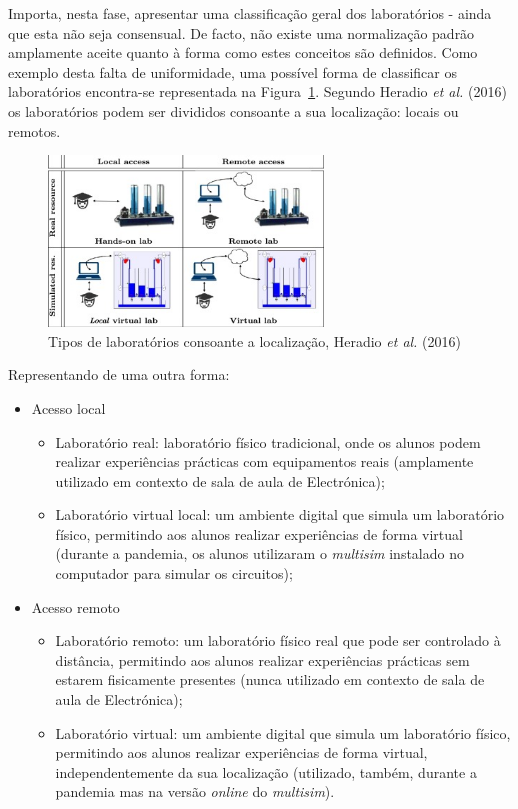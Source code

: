 Importa, nesta fase, apresentar uma classificação geral dos laboratórios - ainda que esta não seja consensual. De facto, não existe uma normalização padrão amplamente aceite quanto à forma como estes conceitos são definidos. Como exemplo desta falta de uniformidade, uma possível forma de classificar os laboratórios encontra-se representada na Figura~\ref{fig:classificaçãoHeratio}. Segundo Heradio \textit{et al.} (2016) \cite{HERADIO20161} os laboratórios podem ser divididos consoante a sua localização: locais ou remotos.

\begin{figure}[hbtp]
    \centering
    \includegraphics[width=0.65\textwidth]{figures/caracteristica_laboratories.jpg}
    \caption{Tipos de laboratórios consoante a localização, Heradio \textit{et al.} (2016) \cite{HERADIO20161}}
    \label{fig:classificaçãoHeratio}
\end{figure}

Representando de uma outra forma:
\begin{itemize}
    \item Acesso local
          \begin{itemize}
              \item Laboratório real: laboratório físico tradicional, onde os alunos podem realizar experiências prácticas com equipamentos reais (amplamente utilizado em contexto de sala de aula de Electrónica);
              \item Laboratório virtual local: um ambiente digital que simula um laboratório físico, permitindo aos alunos realizar experiências de forma virtual (durante a pandemia, os alunos utilizaram o \textit{multisim} instalado no computador para simular os circuitos);
          \end{itemize}
    \item Acesso remoto
          \begin{itemize}
              \item Laboratório remoto: um laboratório físico real que pode ser controlado à distância, permitindo aos alunos realizar experiências prácticas sem estarem fisicamente presentes (nunca utilizado em contexto de sala de aula de Electrónica);
              \item Laboratório virtual: um ambiente digital que simula um laboratório físico, permitindo aos alunos realizar experiências de forma virtual, independentemente da sua localização (utilizado, também, durante a pandemia mas na versão \textit{online} do \textit{multisim}).
          \end{itemize}
\end{itemize}

